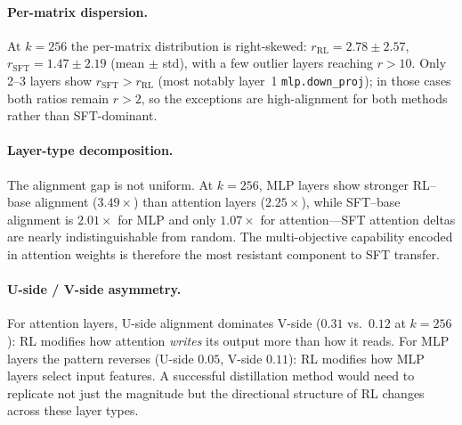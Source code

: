 \begin{table}[h]
\centering
{}
\caption{SVD alignment ratio $r(k)$ for three weight deltas, averaged over 196 matrices. Wilcoxon $p\!<\!1.3\!\times\!10^{-32}$ at all $k$. ``---'' marks $k$ values not computed for SFT/RL--SFT due to compute budget.}
\label{tab:svd_alignment}
\end{table}

\paragraph{Per-matrix dispersion.}
At $k\!=\!256$ the per-matrix distribution is right-skewed: $r_\text{RL}\!=\!2.78\!\pm\!2.57$, $r_\text{SFT}\!=\!1.47\!\pm\!2.19$ (mean $\pm$ std), with a few outlier layers reaching $r\!>\!10$. Only 2--3 layers show $r_\text{SFT}\!>\!r_\text{RL}$ (most notably layer~1 \texttt{mlp.down\_proj}); in those cases both ratios remain $r\!>\!2$, so the exceptions are high-alignment for both methods rather than SFT-dominant.

\paragraph{Layer-type decomposition.}
The alignment gap is not uniform. At $k\!=\!256$, MLP layers show stronger RL--base alignment ($3.49\!\times$) than attention layers ($2.25\!\times$), while SFT--base alignment is $2.01\!\times$ for MLP and only $1.07\!\times$ for attention---SFT attention deltas are nearly indistinguishable from random. The multi-objective capability encoded in attention weights is therefore the most resistant component to SFT transfer.

\paragraph{U-side / V-side asymmetry.}
For attention layers, U-side alignment dominates V-side ($0.31$ vs.\ $0.12$ at $k\!=\!256$): RL modifies how attention \emph{writes} its output more than how it reads. For MLP layers the pattern reverses (U-side $0.05$, V-side $0.11$): RL modifies how MLP layers select input features. A successful distillation method would need to replicate not just the magnitude but the directional structure of RL changes across these layer types.

